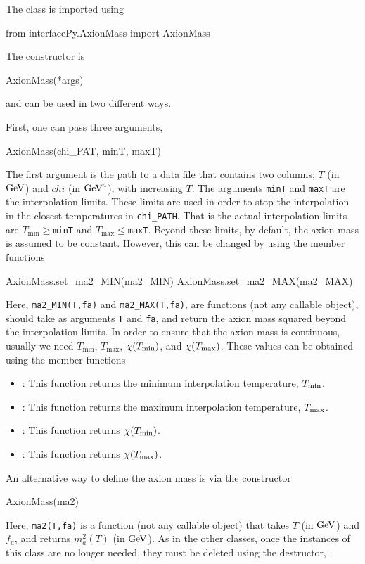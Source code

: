 \documentclass[11pt,a4paper]{article}
\begin{document}
The class is imported using 
%
\begin{py}
	from interfacePy.AxionMass import AxionMass
\end{py}

The constructor is
%
\begin{py}
	AxionMass(*args)
\end{py}
%
and can be used in two different ways. 

First, one can pass three arguments, \ie
%
\begin{py}
	AxionMass(chi_PAT, minT, maxT)
\end{py}
%
The first argument is the path to a data file that contains two columns; $T$ (in ${\rm GeV}$) and $chi$ (in ${\rm GeV}^4$), with increasing $T$. The arguments {\tt minT} and {\tt maxT} are the interpolation limits. These limits are used in order to stop the interpolation in the closest temperatures in {\tt chi\_PATH}. That is the actual interpolation limits are $T_{\min}\geq${\tt minT} and $T_{\max}\leq${\tt maxT}. Beyond these limits, by default, the axion mass is assumed to be constant. However, this can be changed by using the member functions
%
\begin{py}
	AxionMass.set_ma2_MIN(ma2_MIN)
	AxionMass.set_ma2_MAX(ma2_MAX)
\end{py}
%
Here, {\tt ma2\_MIN(T,fa)} and {\tt ma2\_MAX(T,fa)}, are functions (not any callable object), should take as arguments {\tt T} and {\tt fa}, and return the axion mass squared beyond the interpolation limits. In order to ensure that the axion mass is continuous, usually we need $T_{\min}$, $T_{\max}$, $\chi(T_{\rm min})$, and $\chi(T_{\rm max})$. These values can be obtained using the member functions
%
\begin{itemize}
	\item {}: This function returns the minimum interpolation temperature, $T_{\rm min}$. 
	\item {}: This function returns the maximum interpolation temperature, $T_{\rm max}$.
	\item {}: This function returns $\chi(T_{\rm min})$.
	\item {}: This function returns $\chi(T_{\rm max})$.
\end{itemize}

An alternative way to define the axion mass is via the constructor
%
\begin{cpp}
	AxionMass(ma2)
\end{cpp}
%
Here, {\tt ma2(T,fa)} is a function (not any callable object) that takes $T$ (in ${\rm GeV}$) and $f_a$, and returns  $m_a^2(T)$ (in ${\rm GeV}$). As in the other \PY classes, once the instances of this class are no longer needed, they must be deleted using the destructor, . 
\end{document}
